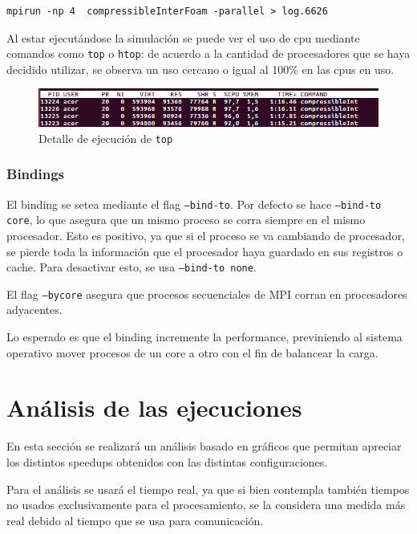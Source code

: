 \documentclass{article}
\begin{document}
\begin{lstlisting}[caption={Ejemplo de comando a ejecutar para resolver con paralelismo.}, captionpos=b]
mpirun -np 4  compressibleInterFoam -parallel > log.6626
\end{lstlisting}

Al estar ejecutándose la simulación se puede ver el uso de cpu mediante comandos como \texttt{top} o \texttt{htop}: de acuerdo a la cantidad de procesadores que se haya decidido utilizar, se observa un uso cercano o igual al 100\% en las cpus en uso.
\begin{figure}[h!]
    \centering
    \includegraphics[scale=0.6]{../res/imgs/image7.png}
    \caption{Detalle de ejecución de \texttt{top}} 
\end{figure}
\subsubsection{Bindings}
El binding se setea mediante el flag \texttt{--bind-to}. Por defecto se hace \texttt{--bind-to core}, lo que asegura que un mismo proceso se corra siempre en el mismo procesador. Esto es positivo, ya que si el proceso se va cambiando de procesador, se pierde toda la información que el procesador haya guardado en sus registros o cache. Para desactivar esto, se usa \texttt{--bind-to none}.

El flag \texttt{--bycore} asegura que procesos secuenciales de MPI corran en procesadores adyacentes.

Lo esperado es que el binding incremente la performance, previniendo al sistema operativo mover procesos de un core a otro con el fin de balancear la carga.

\newpage
\section{Análisis de las ejecuciones}
En esta sección se realizará un análisis basado en gráficos que permitan apreciar los distintos speedups obtenidos con las distintas configuraciones.

Para el análisis se usará el tiempo real, ya que si bien contempla también tiempos no usados exclusivamente para el procesamiento, se la considera una medida más real debido al tiempo que se usa para comunicación. 
\end{document}
